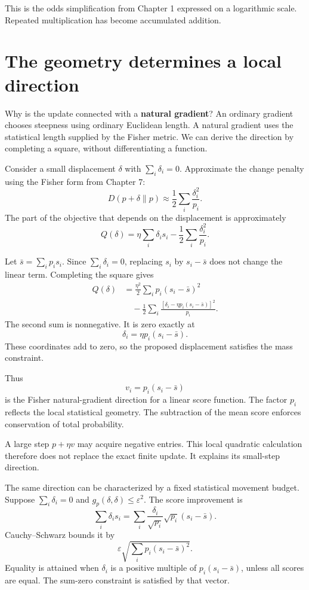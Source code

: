 \documentclass[11pt,oneside,openany]{book}
\theoremstyle{definition}
\theoremstyle{remark}
\numberwithin{equation}{chapter}
\begin{document}
This is the odds simplification from Chapter 1 expressed on a logarithmic scale. Repeated multiplication has become accumulated addition.

\section{The geometry determines a local direction}\label{ch09-the-geometry-determines-a-local-direction}

Why is the update connected with a \textbf{natural gradient}? An ordinary gradient chooses steepness using ordinary Euclidean length. A natural gradient uses the statistical length supplied by the Fisher metric. We can derive the direction by completing a square, without differentiating a function.

Consider a small displacement \(\delta\) with \(\sum_i\delta_i=0\). Approximate the change penalty using the Fisher form from Chapter 7: \[D(p+\delta\|p)\approx\frac12\sum_i\frac{\delta_i^2}{p_i}.\] The part of the objective that depends on the displacement is approximately \[Q(\delta)=\eta\sum_i\delta_i s_i-\frac12\sum_i\frac{\delta_i^2}{p_i}.\]

Let \(\bar s=\sum_i p_i s_i\). Since \(\sum_i\delta_i=0\), replacing \(s_i\) by \(s_i-\bar s\) does not change the linear term. Completing the square gives \[\begin{aligned}
Q(\delta)
&=\frac{\eta^2}{2}\sum_i p_i(s_i-\bar s)^2\\
&\quad-\frac12\sum_i
\frac{[\delta_i-\eta p_i(s_i-\bar s)]^2}{p_i}.
\end{aligned}\] The second sum is nonnegative. It is zero exactly at \[\boxed{\delta_i=\eta p_i(s_i-\bar s).}\] These coordinates add to zero, so the proposed displacement satisfies the mass constraint.

Thus \[v_i=p_i(s_i-\bar s)\] is the Fisher natural-gradient direction for a linear score function. The factor \(p_i\) reflects the local statistical geometry. The subtraction of the mean score enforces conservation of total probability.

A large step \(p+\eta v\) may acquire negative entries. This local quadratic calculation therefore does not replace the exact finite update. It explains its small-step direction.

The same direction can be characterized by a fixed statistical movement budget. Suppose \(\sum_i\delta_i=0\) and \(g_p(\delta,\delta)\leq\varepsilon^2\). The score improvement is \[\sum_i\delta_i s_i
=\sum_i\frac{\delta_i}{\sqrt{p_i}}\sqrt{p_i}(s_i-\bar s).\] Cauchy--Schwarz bounds it by \[\varepsilon\sqrt{\sum_i p_i(s_i-\bar s)^2}.\] Equality is attained when \(\delta_i\) is a positive multiple of \(p_i(s_i-\bar s)\), unless all scores are equal. The sum-zero constraint is satisfied by that vector.
\end{document}
